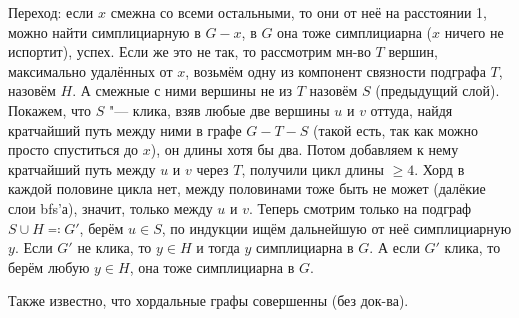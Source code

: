 	Переход: если $x$ смежна со всеми остальными, то они от неё на расстоянии 1, можно найти симплициарную в $G-x$,
	в $G$ она тоже симплициарна ($x$ ничего не испортит), успех.
	Если же это не так, то рассмотрим мн-во $T$ вершин, максимально удалённых от $x$, возьмём одну из компонент
	связности подграфа $T$, назовём $H$.
	А смежные с ними вершины не из $T$ назовём $S$ (предыдущий слой).
	Покажем, что $S$ "--- клика, взяв любые две вершины $u$ и $v$ оттуда, найдя кратчайший путь между
	ними в графе $G-T-S$ (такой есть, так как можно просто спуститься до $x$), он длины хотя бы два.
	Потом добавляем к нему кратчайший путь между $u$ и $v$ через $T$, получили цикл длины $\ge 4$.
	Хорд в каждой половине цикла нет, между половинами тоже быть не может (далёкие слои bfs'а),
	значит, только между $u$ и $v$.
	Теперь смотрим только на подграф $S \cup H \eqcolon G'$, берём $u \in S$, по индукции ищём дальнейшую от неё симплициарную $y$.
	Если $G'$ не клика, то $y \in H$ и тогда $y$ симплициарна в $G$.
	А если $G'$ клика, то берём любую $y \in H$, она тоже симплициарна в $G$.

	Также известно, что хордальные графы совершенны (без док-ва).
